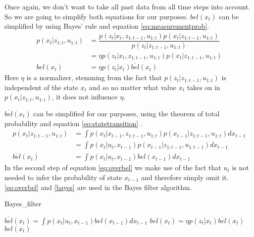 Once again, we don't want to take all past data from all time steps into account. So we are going to simplify both equations for our purposes. $bel(x_t)$ can be simplified by using Bayes' rule and equation \ref{eq:measurementprob}.
\begin{equation}\label{bayes}
\begin{aligned}
p(x_t|z_{1:t}, u_{1:t}) &= \dfrac{p(z_t|x_t,z_{1:t-1},u_{1:t})p(x_t|z_{1:t-1},u_{1:t})}{p(z_t|z_{1:t-1},u_{1:t})}\\
&= \eta p(z_t|x_t,z_{1:t-1},u_{1:t})p(x_t|z_{1:t-1},u_{1:t})\\
bel(x_t) &= \eta p(z_t|x_t)\overline{bel}(x_t)
\end{aligned}
\end{equation}
Here $\eta$ is a normalizer, stemming from the fact that $p(z_t|z_{1:t-1},u_{1:t})$ is independent of the state $x_t$ and so no matter what value $x_t$ takes on in $p(x_t|z_{1:t},u_{1:t})$, it does not influence $\eta$.

$\overline{bel}(x_t)$ can be simplified for our purposes, using the theorem of total probability and equation \ref{eq:statetransition} \citep[p.\ 31-33]{Thrun:2005:PR:1121596}.
\begin{equation} \label{eq:overbel}
\begin{aligned}
p(x_t|z_{1:t-1},u_{1:t}) &= \int p(x_t|x_{t-1},z_{1:t-1},u_{1:t})p(x_{t-1}|z_{1:t-1},u_{1:t})dx_{t-1}\\
&= \int p(x_t|u_t,x_{t-1})p(x_{t-1}|z_{1:t-1},u_{1:t-1})dx_{t-1}\\
\overline{bel}(x_t) &= \int p(x_t|u_t,x_{t-1})bel(x_{t-1})dx_{t-1}
\end{aligned}
\end{equation}
In the second step of equation \ref{eq:overbel} we make use of the fact that $u_t$ is not needed to infer the probability of state $x_{t-1}$ and therefore simply omit it. 
\ref{eq:overbel} and \ref{bayes} are used in the Bayes filter algorithm.
\begin{algorithm}
\caption{Bayes\_filter \citep[p.\ 27]{Thrun:2005:PR:1121596}}
\label{bayes_filter}
\begin{algorithmic}[1]
\State $\overline{bel}(x_t) = \int p(x_t|u_t,x_{t-1})bel(x_{t-1})dx_{t-1}$
\State $bel(x_t) = \eta p(z_t|x_t)\overline{bel}(x_t)$
\EndFor
\State \Return $bel(x_t)$
\EndProcedure
\end{algorithmic}
\end{algorithm}

